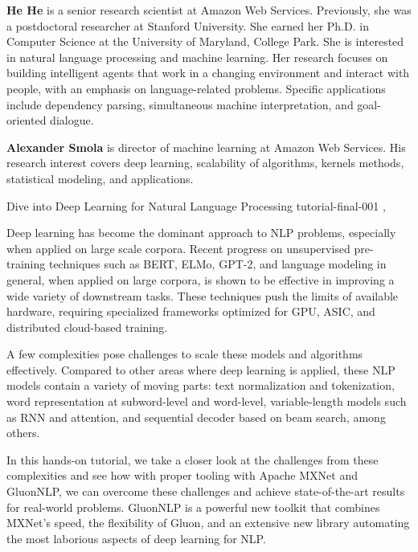 \begin{bio}





\textbf{He He} is a senior research scientist at Amazon Web Services. Previously, she was a postdoctoral researcher at Stanford University. She earned her Ph.D. in Computer Science at the University of Maryland, College Park. She is interested in natural language processing and machine learning. Her research focuses on building intelligent agents that work in a changing environment and interact with people, with an emphasis on language-related problems. Specific applications include dependency parsing, simultaneous machine interpretation, and goal-oriented dialogue.



\textbf{Alexander Smola} is director of machine learning at Amazon Web Services. His research interest covers deep learning, scalability of algorithms, kernels methods, statistical modeling, and applications.


\end{bio}

\begin{tutorial}
  {Dive into Deep Learning for Natural Language Processing}
  {tutorial-final-001}
  {\daydateyear, \tutorialfulltime}
  {\TutLocA}

Deep learning has become the dominant approach to NLP problems, especially when applied on large scale corpora. Recent progress on unsupervised pre-training techniques such as BERT, ELMo, GPT-2, and language modeling in general, when applied on large corpora, is shown to be effective in improving a wide variety of downstream tasks. These techniques push the limits of available hardware, requiring specialized frameworks optimized for GPU, ASIC, and distributed cloud-based training.

A few complexities pose challenges to scale these models and algorithms effectively. Compared to other areas where deep learning is applied, these NLP models contain a variety of moving parts: text normalization and tokenization, word representation at subword-level and word-level, variable-length models such as RNN and attention, and sequential decoder based on beam search, among others.

In this hands-on tutorial, we take a closer look at the challenges from these complexities and see how with proper tooling with Apache MXNet and GluonNLP, we can overcome these challenges and achieve state-of-the-art results for real-world problems. GluonNLP is a powerful new toolkit that combines MXNet’s speed, the flexibility of Gluon, and an extensive new library automating the most laborious aspects of deep learning for NLP.

\end{tutorial}
